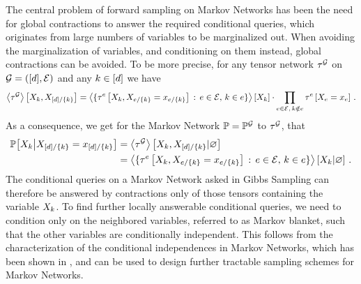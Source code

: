 The central problem of forward sampling on Markov Networks has been the need for global contractions to answer the required conditional queries, which originates from large numbers of variables to be marginalized out.
When avoiding the marginalization of variables, and conditioning on them instead, global contractions can be avoided.
To be more precise, for any tensor network $\tau^{\mathcal{G}}$ on $\mathcal{G}=([d],\mathcal{E})$ and any $k\in[d]$ we have
\begin{align*}
    \left\langle \tau^{\mathcal{G}}\right\rangle \left[ X_{k},X_{[d]/\{k\}} \right]
    = \left\langle \{\tau^{e}\left[X_{k},X_{e/\{k\}}=x_{e/\{k\}}\right] \,:\, e\in\mathcal{E} ,\, k\in e\}\right\rangle \left[ X_{k} \right]
    \cdot \prod_{e\in\mathcal{E}, \, k\notin e} \tau^{e}\left[X_{e}=x_{e}\right] \, .
\end{align*}
As a consequence, we get for the Markov Network $\mathbb{P}=\mathbb{P}^{\mathcal{G}}$ to $\tau^{\mathcal{G}}$, that
\begin{align*}
    \mathbb{P}\big[X_{k}\big|X_{[d]/\{k\}}=x_{[d]/\{k\}}\big]
    &= \left\langle \tau^{\mathcal{G}}\right\rangle \left[ X_{k},X_{[d]/\{k\}} | \varnothing \right] \\
    &= \left\langle \{\tau^{e}\left[X_{k},X_{e/\{k\}}=x_{e/\{k\}}\right] \,:\, e\in\mathcal{E}, \, k\in e\}\right\rangle \left[ X_{k} | \varnothing \right] \, .
\end{align*}
The conditional queries on a Markov Network asked in Gibbs Sampling can therefore be answered by contractions only of those tensors containing the variable $X_{k}$.
To find further locally answerable conditional queries, we need to condition only on the neighbored variables, referred to as Markov blanket, such that the other variables are conditionally independent.
This follows from the characterization of the conditional independences in Markov Networks, which has been shown in , and can be used to design further tractable sampling schemes for Markov Networks.

